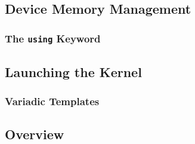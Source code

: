 \subsection{Device Memory Management}

\subsubsection{The \texttt{using} Keyword}

\subsection{Launching the Kernel}

\subsubsection{Variadic Templates}

\subsection{Overview}